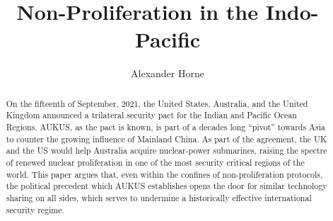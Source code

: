 \documentclass[letterpaper,12pt,twoside]{article} %
\title{Non-Proliferation in the Indo-Pacific}
\author{Alexander Horne}
\date{} %
\begin{document}
\begin{titlepage}
  \maketitle
\vfill

\renewcommand{\abstractname}{\sc\large Executive Summary}
\begin{abstract}

    On the fifteenth of September, 2021, the United States, Australia, and the United Kingdom announced a trilateral security pact for the Indian and Pacific Ocean Regions. AUKUS, as the pact is known, is part of a decades long ``pivot'' towards Asia to counter the growing influence of Mainland China. As part of the agreement, the UK and the US would help Australia acquire nuclear-power submarines, raising the spectre of renewed nuclear proliferation in one of the most security critical regions of the world. This paper argues that, even within the confines of non-proliferation protocols, the political precedent which AUKUS establishes opens the door for similar technology sharing on all sides, which serves to undermine a historically effective international security regime.

\end{abstract}

\end{titlepage}

\tableofcontents
  \vfill
  \pagebreak
\end{document}
